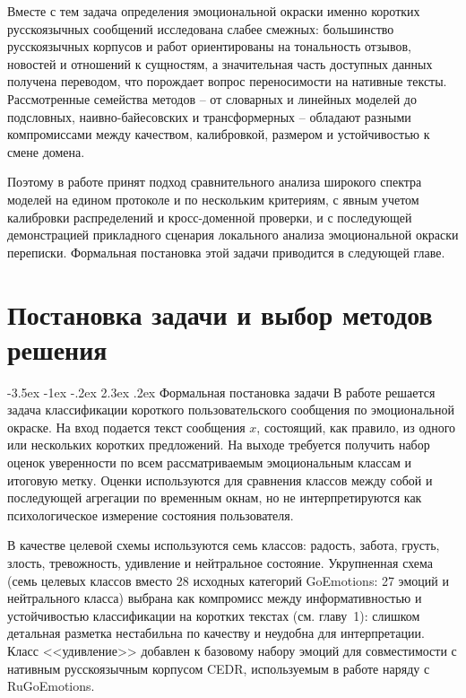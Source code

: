 \documentclass[12pt,a4paper]{report}
\makeatletter
\renewcommand{\section}{\@startsection{section}{1}{\z@}%
  {-3.5ex \@plus -1ex \@minus -.2ex}%
  {2.3ex \@plus .2ex}%
  {\normalfont\large\bfseries\centering}}
\makeatother
\begin{document}
Вместе с тем задача определения эмоциональной окраски именно коротких русскоязычных сообщений исследована слабее смежных: большинство русскоязычных корпусов и работ ориентированы на тональность отзывов, новостей и отношений к сущностям, а значительная часть доступных данных получена переводом, что порождает вопрос переносимости на нативные тексты. Рассмотренные семейства методов -- от словарных и линейных моделей до подсловных, наивно-байесовских и трансформерных -- обладают разными компромиссами между качеством, калибровкой, размером и устойчивостью к смене домена.

Поэтому в работе принят подход сравнительного анализа широкого спектра моделей на едином протоколе и по нескольким критериям, с явным учетом калибровки распределений и кросс-доменной проверки, и с последующей демонстрацией прикладного сценария локального анализа эмоциональной окраски переписки. Формальная постановка этой задачи приводится в следующей главе.

\chapter{Постановка задачи и выбор методов решения}

\section{Формальная постановка задачи}
В работе решается задача классификации короткого пользовательского сообщения по эмоциональной окраске. На вход подается текст сообщения \(x\), состоящий, как правило, из одного или нескольких коротких предложений. На выходе требуется получить набор оценок уверенности по всем рассматриваемым эмоциональным классам и итоговую метку. Оценки используются для сравнения классов между собой и последующей агрегации по временным окнам, но не интерпретируются как психологическое измерение состояния пользователя.

В качестве целевой схемы используются семь классов: радость, забота, грусть, злость, тревожность, удивление и нейтральное состояние. Укрупненная схема (семь целевых классов вместо 28 исходных категорий GoEmotions: 27 эмоций и нейтрального класса) выбрана как компромисс между информативностью и устойчивостью классификации на коротких текстах (см. главу~1): слишком детальная разметка нестабильна по качеству и неудобна для интерпретации. Класс <<удивление>> добавлен к базовому набору эмоций для совместимости с нативным русскоязычным корпусом CEDR, используемым в работе наряду с RuGoEmotions.
\end{document}
